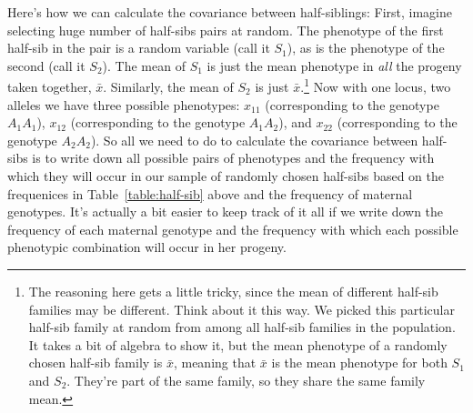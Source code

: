 Here's how we can calculate the covariance between half-siblings:
First, imagine selecting huge number of half-sibs pairs at random.
The phenotype of the first half-sib in the pair is a random variable
(call it $S_1$), as is the phenotype of the second (call it $S_2$).
The mean of $S_1$ is just the mean phenotype in {\it all\/} the
progeny taken together, $\bar x$.  Similarly, the mean of $S_2$ is
just $\bar x$.\footnote{The reasoning here gets a little tricky, since
  the mean of different half-sib families may be different. Think
  about it this way. We picked this particular half-sib family at
  random from among all half-sib families in the population. It takes
  a bit of algebra to show it, but the mean phenotype of a randomly
  chosen half-sib family is $\bar x$, meaning that $\bar x$ is the
  mean phenotype for both $S_1$ and $S_2$. They're part of the same
  family, so they share the same family mean.}  Now with one locus,
two alleles we have three possible phenotypes: $x_{11}$ (corresponding
to the genotype $A_1A_1$), $x_{12}$ (corresponding to the genotype
$A_1A_2$), and $x_{22}$ (corresponding to the genotype $A_2A_2$).  So
all we need to do to calculate the covariance between half-sibs is to
write down all possible pairs of phenotypes and the frequency with
which they will occur in our sample of randomly chosen half-sibs based
on the frequenices in Table~\ref{table:half-sib} above and the
frequency of maternal genotypes.  It's actually a bit easier to keep
track of it all if we write down the frequency of each maternal
genotype and the frequency with which each possible phenotypic
combination will occur in her progeny.
